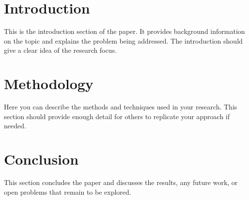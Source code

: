 
\section{Introduction}
This is the introduction section of the paper. It provides background information on the topic and explains the problem being addressed. The introduction should give a clear idea of the research focus.

\section{Methodology}
Here you can describe the methods and techniques used in your research. This section should provide enough detail for others to replicate your approach if needed.

\section{Conclusion}
This section concludes the paper and discusses the results, any future work, or open problems that remain to be explored.
